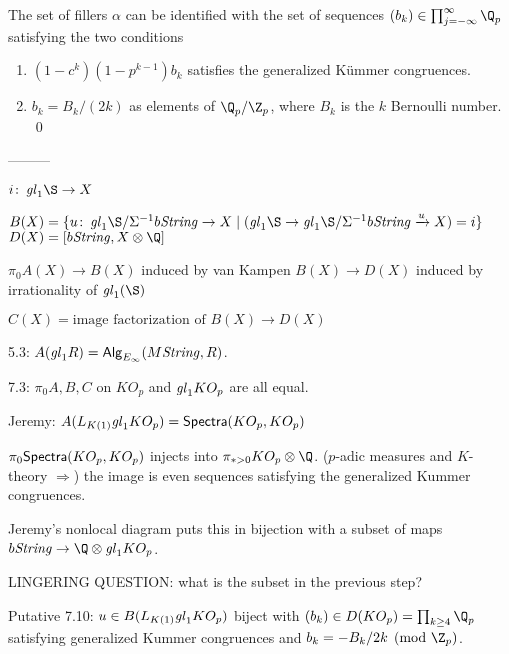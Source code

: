 \begin{theorem}
The set of fillers $\alpha$ can be identified with the set of sequences $(b_k) \in \prod_{j=-\infty}^\infty \Q_p$ satisfying the two conditions
\begin{enumerate}
\item $(1 - c^k)(1 - p^{k-1}) b_k$ satisfies the generalized K\"ummer congruences.
\item $b_k = B_k / (2k)$ as elements of $\Q_p / \Z_p$, where $B_k$ is the $k${\th} Bernoulli number.
\qed
\end{enumerate} 
\end{theorem}


---------

$i\co \gl_1 \S \to X$

\begin{center}
\end{center}
$B(X) = \{u\co \gl_1 \S / \Susp^{-1} b\String \to X \mid (\gl_1 \S \to \gl_1 \S/\Susp^{-1} b\String \xrightarrow{u} X) = i\}$
$D(X) = [b\String, X \otimes \Q]$

$\pi_0 A(X) \to B(X)$ induced by van Kampen
$B(X) \to D(X)$ induced by irrationality of $\gl_1(\S)$

$C(X) = \text{image factorization of $B(X) \to D(X)$}$

5.3: $A(\mathit{gl}_1 R) = \mathsf{Alg}_{E_\infty}(M\mathit{String}, R)$.

7.3: $\pi_0 A, B, C$ on $KO_p$ and $\mathit{gl}_1 KO_p$ are all equal.

Jeremy: $A(L_{K(1)} \mathit{gl}_1 KO_p) = \mathsf{Spectra}(KO_p, KO_p)$

$\pi_0 \mathsf{Spectra}(KO_p, KO_p)$ injects into $\pi_{*>0} KO_p \otimes \Q$. ($p$-adic measures and $K$-theory $\Rightarrow$) the image is even sequences satisfying the generalized Kummer congruences.

Jeremy's nonlocal diagram puts this in bijection with a subset of maps $b\String \to \Q \otimes \gl_1 KO_p$.

LINGERING QUESTION: what is the subset in the previous step?

Putative 7.10: $u \in B(L_{K(1)} \mathit{gl}_1 KO_p)$ biject with $(b_k) \in D(KO_p) = \prod_{k \ge 4} \Q_p$ satisfying generalized Kummer congruences and $b_k = -B_k/2k \pmod{\Z_p}$.







